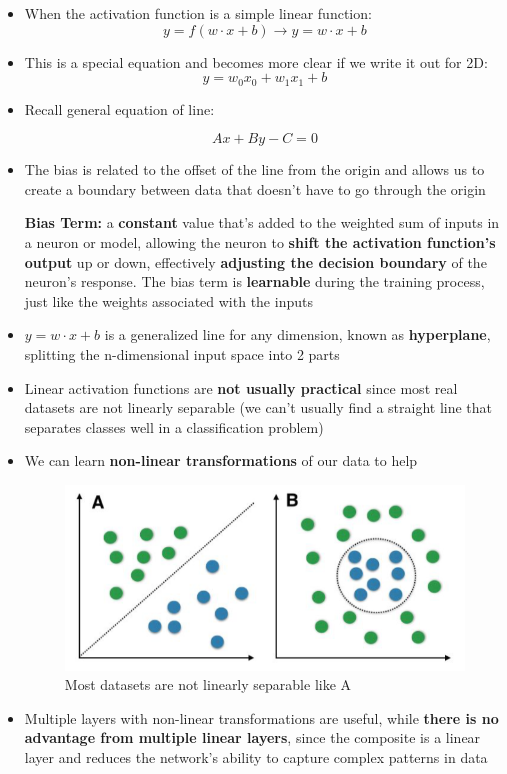 \begin{itemize}
    \item When the activation function is a simple linear function:
\[ y = f(w \cdot x + b) \longrightarrow y = w \cdot x + b\]
    \item This is a special equation and becomes more clear if we write it out for 2D:
\[y = w_0 x_0 + w_1 x_1 + b\]
    \item Recall general equation of line:

\[Ax + By - C = 0\]

    \item The bias is related to the offset of the line from the origin and allows us to create a boundary between data that doesn't have to go through the origin
\begin{definition}
   \textbf{ Bias Term:} a \textbf{constant} value that's added to the weighted sum of inputs in a neuron or model, allowing the neuron to \textbf{shift the activation function's output} up or down, effectively \textbf{adjusting the decision boundary} of the neuron's response. The bias term is \textbf{learnable} during the training process, just like the weights associated with the inputs
\end{definition}
    \item \(y = w \cdot x + b\)  is a generalized line for any dimension, known as \textbf{hyperplane}, splitting the n-dimensional input space into 2 parts
    \item Linear activation functions are \textbf{not usually practical} since most real datasets are not linearly separable (we can't usually find a straight line that separates classes well in a classification problem)
    \item We can learn \textbf{non-linear transformations} of our data to help
\begin{figure}[h!t]
        \centering
        \includegraphics[width=0.5\linewidth]{linearvsnonlinearAF.png}
        \caption{Most datasets are not linearly separable like A}
        \label{fig:enter-label}
    \end{figure}
    \item Multiple layers with non-linear transformations are useful, while \textbf{there is no advantage from multiple linear layers}, since the composite is a linear layer and reduces the network's ability to capture complex patterns in data
\end{itemize}
